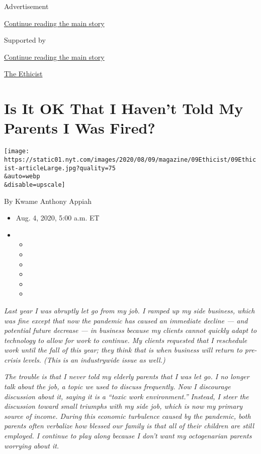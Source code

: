 Advertisement

\protect\hyperlink{after-top}{Continue reading the main story}

Supported by

\protect\hyperlink{after-sponsor}{Continue reading the main story}

\href{/column/the-ethicist}{The Ethicist}

\hypertarget{is-it-ok-that-i-havent-told-my-parents-i-was-fired}{%
\section{Is It OK That I Haven't Told My Parents I Was
Fired?}\label{is-it-ok-that-i-havent-told-my-parents-i-was-fired}}

\texttt{[image: https://static01.nyt.com/images/2020/08/09/magazine/09Ethicist/09Ethicist-articleLarge.jpg?quality=75\\\&auto=webp\\\&disable=upscale]}

By Kwame Anthony Appiah

\begin{itemize}
\item
  Aug. 4, 2020, 5:00 a.m. ET
\item
  \begin{itemize}
  \item
  \item
  \item
  \item
  \item
  \item
  \end{itemize}
\end{itemize}

\emph{Last year I was abruptly let go from my job. I ramped up my side
business, which was fine except that now the pandemic has caused an
immediate decline --- and potential future decrease --- in business
because my clients cannot quickly adapt to technology to allow for work
to continue. My clients requested that I reschedule work until the fall
of this year; they think that is when business will return to pre-crisis
levels. (This is an industrywide issue as well.)}

\emph{The trouble is that I never told my elderly parents that I was let
go. I no longer talk about the job, a topic we used to discuss
frequently. Now I discourage discussion about it, saying it is a ``toxic
work environment.'' Instead, I steer the discussion toward small
triumphs with my side job, which is now my primary source of income.
During this economic turbulence caused by the pandemic, both parents
often verbalize how blessed our family is that all of their children are
still employed. I continue to play along because I don't want my
octogenarian parents worrying about it.}

